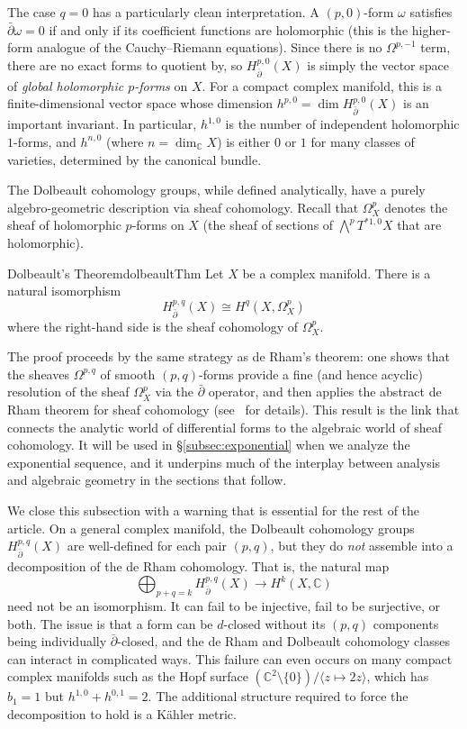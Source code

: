 \documentclass{article}
\newcommand{\C}{\mathbb{C}}
\begin{document}
The case $q = 0$ has a particularly clean interpretation. A $(p,0)$-form
$\omega$ satisfies $\bar\partial\omega = 0$ if and only if its coefficient
functions are holomorphic (this is the higher-form analogue of the
Cauchy--Riemann equations). Since there is no $\Omega^{p,-1}$ term, there are
no exact forms to quotient by, so $H^{p,0}_{\bar\partial}(X)$ is simply the
vector space of \emph{global holomorphic $p$-forms} on $X$. For a compact
complex manifold, this is a finite-dimensional vector space whose dimension
$h^{p,0} = \dim H^{p,0}_{\bar\partial}(X)$ is an important invariant. In
particular, $h^{1,0}$ is the number of independent holomorphic $1$-forms, and
$h^{n,0}$ (where $n = \dim_\C X$) is either $0$ or $1$ for many classes of
varieties, determined by the canonical bundle.

The Dolbeault cohomology groups, while defined analytically, have a purely
algebro-geometric description via sheaf cohomology. Recall that $\Omega^p_X$
denotes the sheaf of holomorphic $p$-forms on $X$ (the sheaf of sections of
$\bigwedge^p T^{*1,0}X$ that are holomorphic).

\begin{thm}{Dolbeault's Theorem}{dolbeaultThm}
  Let $X$ be a complex manifold. There is a natural isomorphism
  \[
    H^{p,q}_{\bar\partial}(X) \cong H^q(X, \Omega^p_X)
  \]
  where the right-hand side is the sheaf cohomology of $\Omega^p_X$.
\end{thm}

The proof proceeds by the same strategy as de Rham's theorem: one shows that
the sheaves $\Omega^{p,q}$ of smooth $(p,q)$-forms provide a fine (and hence
acyclic) resolution of the sheaf $\Omega^p_X$ via the $\bar\partial$ operator,
and then applies the abstract de Rham theorem for sheaf cohomology
(see~\cite{NateHodge} for details). This result is the link that connects the
analytic world of differential forms to the algebraic world of sheaf
cohomology. It will be used in \S\ref{subsec:exponential} when we analyze the
exponential sequence, and it underpins much of the interplay between analysis
and algebraic geometry in the sections that follow.

We close this subsection with a warning that is essential for the rest of the
article. On a general complex manifold, the Dolbeault cohomology groups
$H^{p,q}_{\bar\partial}(X)$ are well-defined for each pair $(p,q)$, but they
do \emph{not} assemble into a decomposition of the de Rham cohomology. That is,
the natural map
\[
  \bigoplus_{p+q=k} H^{p,q}_{\bar\partial}(X) \longrightarrow H^k(X, \C)
\]
need not be an isomorphism. It can fail to be injective, fail to be surjective, or both. The issue is that a
form can be $d$-closed without its $(p,q)$ components being individually $\bar\partial$-closed, and the de
Rham and Dolbeault cohomology classes can interact in complicated ways. This failure can even occurs on many
compact complex manifolds such as the Hopf surface $(\C^2 \setminus \{0\}) / \langle z \mapsto 2z \rangle$,
which has $b_1 = 1$ but $h^{1,0} + h^{0,1} = 2$. The additional structure required to force the decomposition
to hold is a K\"{a}hler metric.
\end{document}
